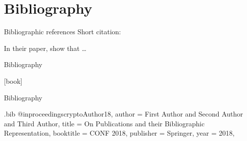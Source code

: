 \documentclass[table,aspectratio=43]{beamer}
\begin{document}
  \section{Bibliography}

  \begin{frame}{Bibliographic references}
    Short citation: \cite{cryptoAuthor18}

    In their paper, \textcite{cryptoAuthor18} show that \dots %
  \end{frame}

  \begin{frame}[allowframebreaks]{Bibliography}
    \printbibliography
  \end{frame}

  [book]
  \begin{frame}[allowframebreaks]{Bibliography}
    \printbibliography
  \end{frame}

  \begin{filecontents*}{\jobname.bib}
    @inproceedings{cryptoAuthor18,
      author       = {First Author and
          Second Author and
          Third Author},
      title        = {On Publications and their Bibliographic Representation},
      booktitle    = {CONF 2018},
      publisher    = {Springer},
      year         = {2018},
    }
\end{filecontents*}
\end{document}
